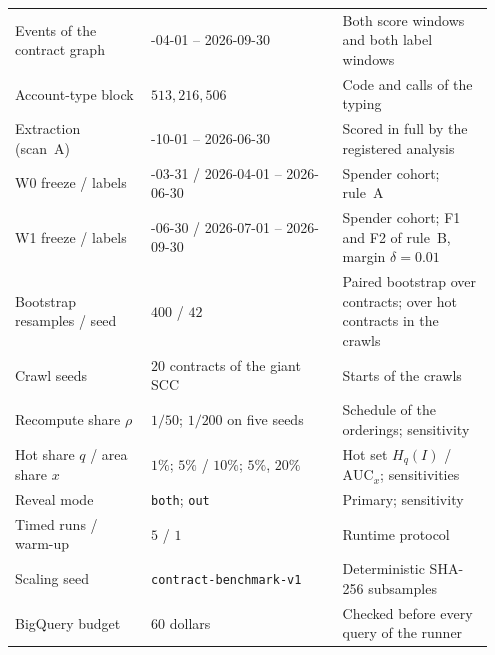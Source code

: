 {\begin{longtable}{@{}>{\raggedright\arraybackslash}p{0.27\linewidth}>{\raggedright\arraybackslash}p{0.38\linewidth}>{\raggedright\arraybackslash}p{0.30\linewidth}@{}}
Events of the contract graph & 2025-04-01 -- 2026-09-30 & Both score windows and both label windows \\
Account-type block & $513{,}216{,}506$ & Code and calls of the typing \\
Extraction (scan~A) & 2023-10-01 -- 2026-06-30 & Scored in full by the registered analysis \\
W0 freeze / labels & 2026-03-31 / 2026-04-01 -- 2026-06-30 & Spender cohort; rule~A \\
W1 freeze / labels & 2026-06-30 / 2026-07-01 -- 2026-09-30 & Spender cohort; F1 and F2 of rule~B, margin $\delta=0.01$ \\
Bootstrap resamples / seed & $400$ / $42$ & Paired bootstrap over contracts; over hot contracts in the crawls \\
Crawl seeds & $20$ contracts of the giant SCC & Starts of the crawls \\
Recompute share $\rho$ & $1/50$; $1/200$ on five seeds & Schedule of the orderings; sensitivity \\
Hot share $q$ / area share $x$ & $1\%$; $5\%$ / $10\%$; $5\%$, $20\%$ & Hot set $H_q(I)$ / $\mathrm{AUC}_x$; sensitivities \\
Reveal mode & \texttt{both}; \texttt{out} & Primary; sensitivity \\
Timed runs / warm-up & $5$ / $1$ & Runtime protocol \\
Scaling seed & \texttt{contract-benchmark-v1} & Deterministic SHA-256 subsamples \\
BigQuery budget & $60$ dollars & Checked before every query of the runner \\
\end{longtable}
}







